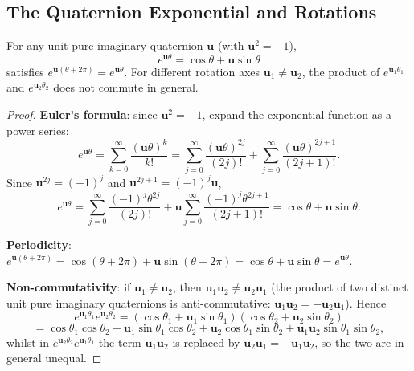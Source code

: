 \subsection{The Quaternion Exponential and Rotations}

\begin{proposition}\label{prop:quaternion_exp_rotation}
For any unit pure imaginary quaternion $\mathbf{u}$ (with $\mathbf{u}^2 = -1$),
\[
e^{\mathbf{u}\theta} = \cos\theta + \mathbf{u}\sin\theta
\]
satisfies $e^{\mathbf{u}(\theta + 2\pi)} = e^{\mathbf{u}\theta}$. For different rotation axes $\mathbf{u}_1 \neq \mathbf{u}_2$, the product of $e^{\mathbf{u}_1\theta_1}$ and $e^{\mathbf{u}_2\theta_2}$ does not commute in general.
\end{proposition}

\begin{proof}
\textbf{Euler's formula}: since $\mathbf{u}^2 = -1$, expand the exponential function as a power series:
\[
e^{\mathbf{u}\theta} = \sum_{k=0}^{\infty} \frac{(\mathbf{u}\theta)^k}{k!} = \sum_{j=0}^{\infty} \frac{(\mathbf{u}\theta)^{2j}}{(2j)!} + \sum_{j=0}^{\infty} \frac{(\mathbf{u}\theta)^{2j+1}}{(2j+1)!}.
\]
Since $\mathbf{u}^{2j} = (-1)^j$ and $\mathbf{u}^{2j+1} = (-1)^j\mathbf{u}$,
\[
e^{\mathbf{u}\theta} = \sum_{j=0}^{\infty} \frac{(-1)^j\theta^{2j}}{(2j)!} + \mathbf{u}\sum_{j=0}^{\infty} \frac{(-1)^j\theta^{2j+1}}{(2j+1)!} = \cos\theta + \mathbf{u}\sin\theta.
\]

\textbf{Periodicity}: $e^{\mathbf{u}(\theta+2\pi)} = \cos(\theta+2\pi) + \mathbf{u}\sin(\theta+2\pi) = \cos\theta + \mathbf{u}\sin\theta = e^{\mathbf{u}\theta}$.

\textbf{Non-commutativity}: if $\mathbf{u}_1 \neq \mathbf{u}_2$, then $\mathbf{u}_1\mathbf{u}_2 \neq \mathbf{u}_2\mathbf{u}_1$ (the product of two distinct unit pure imaginary quaternions is anti-commutative: $\mathbf{u}_1\mathbf{u}_2 = -\mathbf{u}_2\mathbf{u}_1$). Hence
\[
e^{\mathbf{u}_1\theta_1} e^{\mathbf{u}_2\theta_2} = (\cos\theta_1 + \mathbf{u}_1\sin\theta_1)(\cos\theta_2 + \mathbf{u}_2\sin\theta_2)
\]
\[
= \cos\theta_1\cos\theta_2 + \mathbf{u}_1\sin\theta_1\cos\theta_2 + \mathbf{u}_2\cos\theta_1\sin\theta_2 + \mathbf{u}_1\mathbf{u}_2\sin\theta_1\sin\theta_2,
\]
whilst in $e^{\mathbf{u}_2\theta_2} e^{\mathbf{u}_1\theta_1}$ the term $\mathbf{u}_1\mathbf{u}_2$ is replaced by $\mathbf{u}_2\mathbf{u}_1 = -\mathbf{u}_1\mathbf{u}_2$, so the two are in general unequal.
\end{proof}

